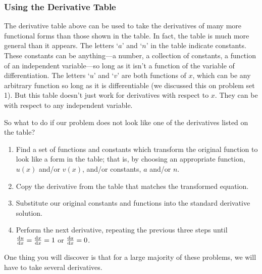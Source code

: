 \documentclass[final,a4paper,12pt]{article}
\theoremstyle{definition}
\begin{document}
\subsubsection{Using the Derivative Table}
The derivative table above can be used to take the derivatives of many more
functional forms than those shown in the table.  In fact, the table is much more
general than it appears.  The letters `$a$' and `$n$' in the table indicate
constants.  These constants can be anything---a number, a collection of
constants, a function of an independent variable---so long as it isn't a
function of the variable of differentiation.  The letters `$u$' and `$v$' are
both functions of $x$, which can be any arbitrary function so long as it is
differentiable (we discussed this on problem set 1).  But this table doesn't
just work for derivatives with respect to $x$.  They can be with respect to any
independent variable.

So what to do if our problem does not look like one of the derivatives listed on
the table?
\begin{enumerate}
    \item Find a set of functions and constants which transform the original
    function to look like a form in the table; that is, by choosing an appropriate
    function, $u(x)$ and/or $v(x)$, and/or constants, $a$ and/or $n$.

    \item Copy the derivative from the table that matches the transformed
    equation.

    \item Substitute our original constants and functions into the standard
    derivative solution.

    \item Perform the next derivative, repeating the previous three steps until
    $\dv{u}{x} = \dv{x}{x} = 1$ or $\dv{a}{x} = 0$.
\end{enumerate}

One thing you will discover is that for a large majority of these problems, we will
have to take several derivatives.
\end{document}
